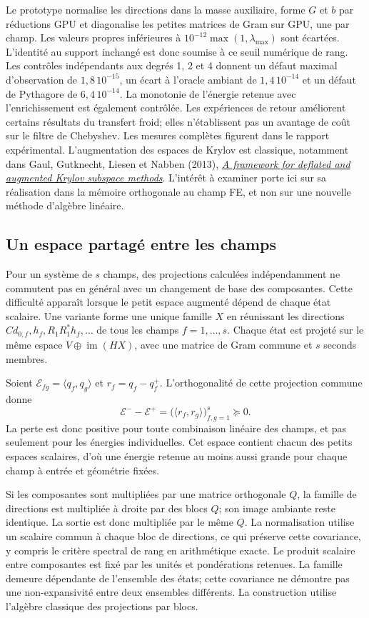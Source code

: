 \documentclass[11pt,a4paper]{article}
\begin{document}
Le prototype normalise les directions dans la masse auxiliaire, forme
$G$ et $b$ par réductions GPU et diagonalise les petites matrices de Gram
sur GPU, une par champ. Les valeurs propres inférieures à
$10^{-12}\max(1,\lambda_{\max})$ sont écartées. L'identité au support
inchangé est donc soumise à ce seuil numérique de rang. Les contrôles
indépendants aux degrés 1, 2 et 4 donnent un défaut maximal d'observation
de $1{,}8\,10^{-15}$, un écart à l'oracle ambiant de
$1{,}4\,10^{-14}$ et un défaut de Pythagore de $6{,}4\,10^{-14}$.
La monotonie de l'énergie retenue avec l'enrichissement est également
contrôlée. Les expériences de retour améliorent certains résultats
du transfert froid; elles n'établissent pas un avantage de coût
sur le filtre de Chebyshev. Les mesures complètes figurent dans le
rapport expérimental.
L'augmentation des espaces de Krylov est classique, notamment dans
Gaul, Gutknecht, Liesen et Nabben (2013),
\href{https://people.math.ethz.ch/~mhg/pub/defl-GGLN1-SIMAX.pdf}{\emph{A framework for deflated and augmented Krylov subspace methods}}.
L'intérêt à examiner porte ici sur sa réalisation dans la mémoire
orthogonale au champ FE, et non sur une nouvelle méthode d'algèbre linéaire.

\subsection{Un espace partagé entre les champs}
Pour un système de $s$ champs, des projections calculées indépendamment
ne commutent pas en général avec un changement de base des composantes.
Cette difficulté apparaît lorsque le petit espace augmenté dépend de
chaque état scalaire. Une variante forme une unique famille $X$ en
réunissant les directions $Cd_{0,f},h_f,R_1R_1^*h_f,\ldots$ de tous
les champs $f=1,\ldots,s$. Chaque état est projeté sur le même espace
$V\oplus\operatorname{im}(HX)$, avec une matrice de Gram commune
et $s$ seconds membres.

Soient $\mathcal E_{fg}=\langle q_f,q_g\rangle$ et
$r_f=q_f-q_f^+$. L'orthogonalité de cette projection commune donne
\[
 \mathcal E^- - \mathcal E^+
   =\bigl(\langle r_f,r_g\rangle\bigr)_{f,g=1}^s\succeq0.
\]
La perte est donc positive pour toute combinaison linéaire des champs,
et pas seulement pour les énergies individuelles. Cet espace contient
chacun des petits espaces scalaires, d'où une énergie retenue au moins
aussi grande pour chaque champ à entrée et géométrie fixées.

Si les composantes sont multipliées par une matrice orthogonale $Q$,
la famille de directions est multipliée à droite par des blocs $Q$;
son image ambiante reste identique. La sortie est donc multipliée par
le même $Q$. La normalisation utilise un scalaire commun à chaque
bloc de directions, ce qui préserve cette covariance, y compris
le critère spectral de rang en arithmétique exacte. Le produit scalaire
entre composantes est fixé par les unités et pondérations retenues.
La famille demeure dépendante de l'ensemble des états; cette covariance
ne démontre pas une non-expansivité entre deux ensembles différents.
La construction utilise l'algèbre classique des projections par blocs.
\end{document}
